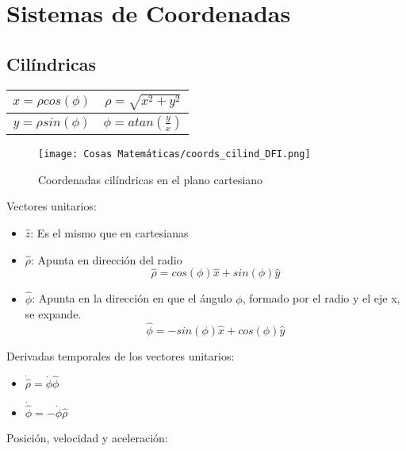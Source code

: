 \newpage
\section{Sistemas de Coordenadas}

\subsection{Cilíndricas}

\begin{table}[H]
    \centering
    \begin{tabular}{|c|c|}
        \hline
        $x = {\rho}cos(\phi)$ & $\rho = \sqrt{x^2 + y^2}$ \\
        \hline
        $y = {\rho}sin(\phi)$ & $\phi = atan(\frac{y}{x})$ \\
        \hline
    \end{tabular}
\end{table}

\begin{figure}[H]
    \centering
    \texttt{[image: Cosas Matemáticas/coords\_cilind\_DFI.png]}
    \caption{Coordenadas cilíndricas en el plano cartesiano}
    \label{fig:C.cilindricas}
\end{figure}

Vectores unitarios:

\begin{itemize}
    \item $\hat{z}$: Es el mismo que en cartesianas
    \item $\hat{\rho}$: Apunta en dirección del radio
        \[\hat{\rho} = cos(\phi)\hat{x} + sin(\phi)\hat{y}\]
    \item $\hat{\phi}$: Apunta en la dirección en que el ángulo $\phi$, formado por el radio y el eje x, se expande. %
        \[\hat{\phi} = -sin(\phi)\hat{x} + cos(\phi)\hat{y}\]
\end{itemize}

\medbreak

Derivadas temporales de los vectores unitarios:

\begin{itemize}
    \item $\dot{\hat{\rho}} = \dot{\phi}\hat{\phi}$
    \item $\dot{\hat{\phi}} = -\dot{\phi}\hat{\rho}$
\end{itemize}

\medbreak

Posición, velocidad y aceleración:

